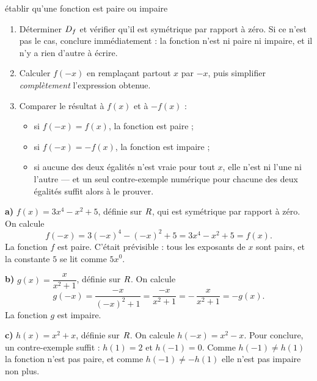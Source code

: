\begin{methode}{établir qu'une fonction est paire ou impaire}
\begin{enumerate}[label=\textbf{\arabic*.}, leftmargin=1.6em, itemsep=0.2em]
  \item Déterminer $D_{f}$ et vérifier qu'il est symétrique par rapport à
        zéro. Si ce n'est pas le cas, conclure immédiatement : la fonction
        n'est ni paire ni impaire, et il n'y a rien d'autre à écrire.
  \item Calculer $f(-x)$ en remplaçant partout $x$ par $-x$, puis simplifier
        \emph{complètement} l'expression obtenue.
  \item Comparer le résultat à $f(x)$ et à $-f(x)$ :
        \begin{itemize}[leftmargin=1.2em, itemsep=0.05em]
          \item si $f(-x) = f(x)$, la fonction est paire ;
          \item si $f(-x) = -f(x)$, la fonction est impaire ;
          \item si aucune des deux égalités n'est vraie pour tout $x$, elle
                n'est ni l'une ni l'autre — et un seul contre-exemple
                numérique pour chacune des deux égalités suffit alors à le prouver.
        \end{itemize}
\end{enumerate}
\end{methode}

\begin{exemple}
\textbf{a)} $f(x) = 3x^{4} - x^{2} + 5$, définie sur $R$, qui est symétrique
par rapport à zéro. On calcule
\[
  f(-x) = 3(-x)^{4} - (-x)^{2} + 5 = 3x^{4} - x^{2} + 5 = f(x).
\]
La fonction $f$ est paire. C'était prévisible : tous les exposants de $x$
sont pairs, et la constante $5$ se lit comme $5x^{0}$.

\textbf{b)} $g(x) = \dfrac{x}{x^{2}+1}$, définie sur $R$. On calcule
\[
  g(-x) = \frac{-x}{(-x)^{2}+1} = \frac{-x}{x^{2}+1}
        = -\,\frac{x}{x^{2}+1} = -g(x).
\]
La fonction $g$ est impaire.

\textbf{c)} $h(x) = x^{2} + x$, définie sur $R$. On calcule
$h(-x) = x^{2} - x$. Pour conclure, un contre-exemple suffit : $h(1) = 2$ et
$h(-1) = 0$. Comme $h(-1) \neq h(1)$ la fonction n'est pas paire, et comme
$h(-1) \neq -h(1)$ elle n'est pas impaire non plus.
\end{exemple}


